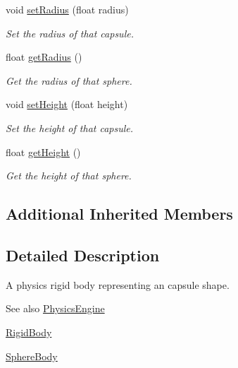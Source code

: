 \begin{DoxyCompactItemize}
void \hyperlink{classTarbora_1_1CapsuleBody_a10ae8b263f437a7d810f727cd7e7e943}{set\+Radius} (float radius)
\begin{DoxyCompactList}\small\item\em Set the radius of that capsule. \end{DoxyCompactList}\item 
\mbox{\label{classTarbora_1_1CapsuleBody_a3c4217bfdf918f48a49221e07aee262c}} 
float \hyperlink{classTarbora_1_1CapsuleBody_a3c4217bfdf918f48a49221e07aee262c}{get\+Radius} ()
\begin{DoxyCompactList}\small\item\em Get the radius of that sphere. \end{DoxyCompactList}\item 
void \hyperlink{classTarbora_1_1CapsuleBody_a8ecfb8196d5156649b8e04256e1d63c1}{set\+Height} (float height)
\begin{DoxyCompactList}\small\item\em Set the height of that capsule. \end{DoxyCompactList}\item 
\mbox{\label{classTarbora_1_1CapsuleBody_a521b8b538755f1f72c7298a4a291053d}} 
float \hyperlink{classTarbora_1_1CapsuleBody_a521b8b538755f1f72c7298a4a291053d}{get\+Height} ()
\begin{DoxyCompactList}\small\item\em Get the height of that sphere. \end{DoxyCompactList}\end{DoxyCompactItemize}
\subsection*{Additional Inherited Members}


\subsection{Detailed Description}
A physics rigid body representing an capsule shape. 

\begin{DoxySeeAlso}{See also}
\hyperlink{classTarbora_1_1PhysicsEngine}{Physics\+Engine} 

\hyperlink{classTarbora_1_1RigidBody}{Rigid\+Body} 

\hyperlink{classTarbora_1_1SphereBody}{Sphere\+Body} 
\end{DoxySeeAlso}


